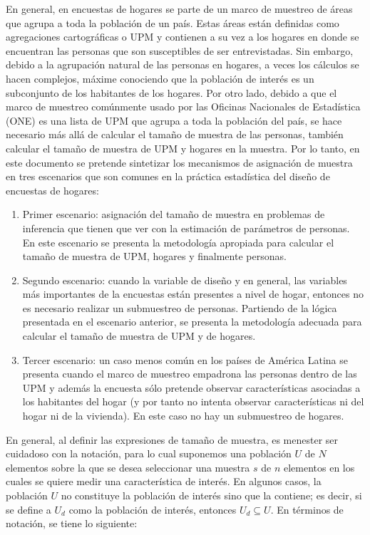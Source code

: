 En general, en encuestas de hogares se parte de un marco de muestreo de áreas que agrupa a toda la población de un país. Estas áreas están definidas como agregaciones cartográficas o UPM y contienen a su vez a los hogares en donde se encuentran las personas que son susceptibles de ser entrevistadas. Sin embargo, debido a la agrupación natural de las personas en hogares, a veces los cálculos se hacen complejos, máxime conociendo que la población de interés es un subconjunto de los habitantes de los hogares. Por otro lado, debido a que el marco de muestreo comúnmente usado por las Oficinas Nacionales de Estadística (ONE) es una lista de UPM que agrupa a toda la población del país, se hace necesario más allá de calcular el tamaño de muestra de las personas, también calcular el tamaño de muestra de UPM y hogares en la muestra. Por lo tanto, en este documento se pretende sintetizar los mecanismos de asignación de muestra en tres escenarios que son comunes en la práctica estadística del diseño de encuestas de hogares:

\begin{enumerate}
\def\labelenumi{\arabic{enumi}.}
\item
  Primer escenario: asignación del tamaño de muestra en problemas de inferencia que tienen que ver con la estimación de parámetros de personas. En este escenario se presenta la metodología apropiada para calcular el tamaño de muestra de UPM, hogares y finalmente personas.
\item
  Segundo escenario: cuando la variable de diseño y en general, las variables más importantes de la encuestas están presentes a nivel de hogar, entonces no es necesario realizar un submuestreo de personas. Partiendo de la lógica presentada en el escenario anterior, se presenta la metodología adecuada para calcular el tamaño de muestra de UPM y de hogares.
\item
  Tercer escenario: un caso menos común en los países de América Latina se presenta cuando el marco de muestreo empadrona las personas dentro de las UPM y además la encuesta sólo pretende observar características asociadas a los habitantes del hogar (y por tanto no intenta observar características ni del hogar ni de la vivienda). En este caso no hay un submuestreo de hogares.
\end{enumerate}

En general, al definir las expresiones de tamaño de muestra, es menester ser cuidadoso con la notación, para lo cual suponemos una población \(U\) de \(N\) elementos sobre la que se desea seleccionar una muestra \(s\) de \(n\) elementos en los cuales se quiere medir una característica de interés. En algunos casos, la población \(U\) no constituye la población de interés sino que la contiene; es decir, si se define a \(U_d\) como la población de interés, entonces \(U_d \subseteq U\). En términos de notación, se tiene lo siguiente:

